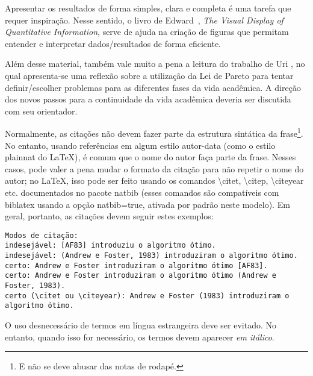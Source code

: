 Apresentar os resultados de forma simples, clara e completa é uma tarefa que
requer inspiração. Nesse sentido, o livro de Edward~\citet{tufte01:visualDisplay},
\emph{The Visual Display of Quantitative Information}, serve de ajuda na
criação de figuras que permitam entender e interpretar dados/resultados de forma
eficiente.

Além desse material, também vale muito a pena a leitura do trabalho de
Uri \citet{alon09:how}, no qual apresenta-se uma reflexão sobre a utilização
da Lei de Pareto para tentar definir/escolher problemas para as diferentes
fases da vida acadêmica. A direção dos novos passos para a continuidade da
vida acadêmica deveria ser discutida com seu orientador.

\label{sec:consideracoes_preliminares}

Normalmente, as citações não devem fazer parte da estrutura sintática da
frase\footnote{E não se deve abusar das notas de rodapé.}.
No entanto, usando referências em algum estilo autor-data (como o estilo
plainnat do \LaTeX{}), é comum que o nome do autor faça parte da frase. Nesses
casos, pode valer a pena mudar o formato da citação para não repetir o nome do
autor; no \LaTeX{}, isso pode ser feito usando os comandos
\textsf{\textbackslash{}citet}, \textsf{\textbackslash{}citep},
\textsf{\textbackslash{}citeyear} etc. documentados no pacote
natbib \citep{natbib} (esses comandos são compatíveis com biblatex
usando a opção \textsf{natbib=true}, ativada por padrão neste modelo). Em geral,
portanto, as citações devem seguir estes exemplos:

\footnotesize
\begin{verbatim}
Modos de citação:
indesejável: [AF83] introduziu o algoritmo ótimo.
indesejável: (Andrew e Foster, 1983) introduziram o algoritmo ótimo.
certo: Andrew e Foster introduziram o algoritmo ótimo [AF83].
certo: Andrew e Foster introduziram o algoritmo ótimo (Andrew e Foster, 1983).
certo (\citet ou \citeyear): Andrew e Foster (1983) introduziram o algoritmo ótimo.
\end{verbatim}
\normalsize

O uso desnecessário de termos em língua estrangeira deve ser evitado. No entanto,
quando isso for necessário, os termos devem aparecer \textit{em itálico}.

